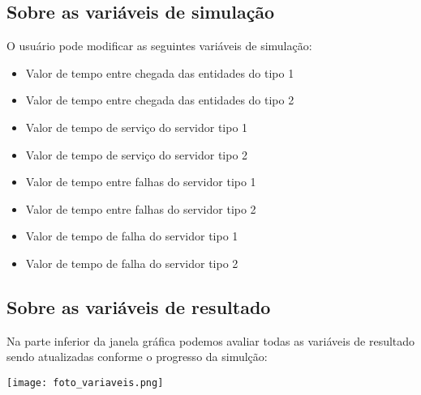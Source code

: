 \documentclass{article}
\begin{document}
        \subsection{Sobre as variáveis de simulação}
            O usuário pode modificar as seguintes variáveis de simulação:
            \begin{itemize}
                \item Valor de tempo entre chegada das entidades do tipo 1
                \item Valor de tempo entre chegada das entidades do tipo 2
                \item Valor de tempo de serviço do servidor tipo 1 
                \item Valor de tempo de serviço do servidor tipo 2
                \item Valor de tempo entre falhas do servidor tipo 1
                \item Valor de tempo entre falhas do servidor tipo 2
                \item Valor de tempo de falha do servidor tipo 1
                \item Valor de tempo de falha do servidor tipo 2
            \end{itemize}
        
        \subsection{Sobre as variáveis de resultado}
            Na parte inferior da janela gráfica podemos avaliar todas as variáveis
            de resultado sendo atualizadas conforme o progresso da simulção:
            
            \begin{center}
                \texttt{[image: foto\_variaveis.png]}
            \end{center}
        
\end{document}
